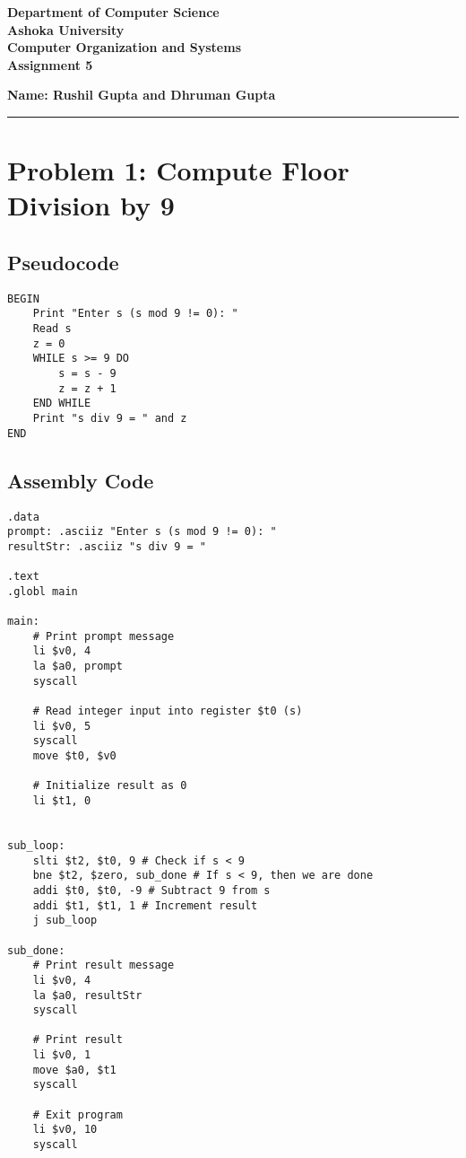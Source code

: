 \documentclass[a4paper]{article}
\begin{document}
\begin{center}
{\large \bf \color{red}  Department of Computer Science} \\
{\large \bf \color{red}  Ashoka University} \\[0.1in]
{\large \bf \color{blue} Computer Organization and Systems} \\[0.05in]
{\bf \color{YellowOrange} Assignment 5}
\end{center}
\medskip

{\hfill {\textbf{Name: Rushil Gupta and Dhruman Gupta} } }

\bigskip
\hrule

\section*{Problem 1: Compute Floor Division by 9}

\subsection*{Pseudocode}
\begin{verbatim}
BEGIN
    Print "Enter s (s mod 9 != 0): "
    Read s
    z = 0
    WHILE s >= 9 DO
        s = s - 9
        z = z + 1
    END WHILE
    Print "s div 9 = " and z
END
\end{verbatim}

\vspace{2mm}
\subsection*{Assembly Code}
\begin{verbatim}
.data
prompt: .asciiz "Enter s (s mod 9 != 0): "
resultStr: .asciiz "s div 9 = "

.text
.globl main

main:
    # Print prompt message
    li $v0, 4
    la $a0, prompt
    syscall

    # Read integer input into register $t0 (s)
    li $v0, 5
    syscall
    move $t0, $v0

    # Initialize result as 0
    li $t1, 0


sub_loop:
    slti $t2, $t0, 9 # Check if s < 9
    bne $t2, $zero, sub_done # If s < 9, then we are done
    addi $t0, $t0, -9 # Subtract 9 from s
    addi $t1, $t1, 1 # Increment result
    j sub_loop

sub_done:
    # Print result message
    li $v0, 4
    la $a0, resultStr
    syscall

    # Print result
    li $v0, 1
    move $a0, $t1
    syscall

    # Exit program
    li $v0, 10
    syscall
\end{verbatim}
\end{document}
